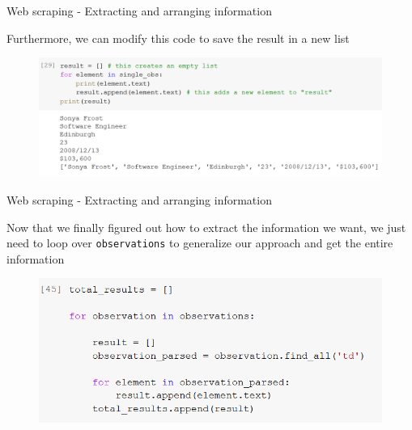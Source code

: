 \documentclass[aspectratio=169]{beamer}
\begin{document}
\begin{frame}{Web scraping - Extracting and arranging information}

	Furthermore, we can modify this code to save the result in a new list

	\begin{figure}
		\centering
		\includegraphics[width=0.9\linewidth]{img/td_new_list_text.png}
	\end{figure}

\end{frame}

\begin{frame}{Web scraping - Extracting and arranging information}

	Now that we finally figured out how to extract the information we want, we just need to loop over \texttt{observations} to generalize our approach and get the entire information

	\begin{figure}
		\centering
		\includegraphics[width=0.6\linewidth]{img/tr_loop.png}
	\end{figure}

\end{frame}
\end{document}
